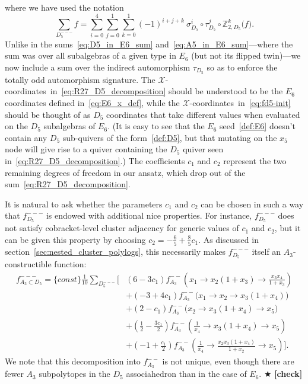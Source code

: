 \documentclass[12pt]{article}
\def\nl{\nonumber\\}
\def\xcoords{$\mathcal{X}$-coordinates}
\def\draftnote#1{{\color{red} $\bigstar$ }{\bf [#1]}}
\begin{document}
where we have used the notation
\begin{equation}
	\sum_{D_5^{---}} f = \sum_{i=0}^4\sum_{j=0}^1\sum_{k=0}^1 (-1)^{i+j+k}\  \sigma_{D_5}^i \circ \tau_{D_5}^j \circ \mathbb{Z}_{2,D_5}^k \big(f\big).
\end{equation}
Unlike in the sums~\eqref{eq:D5_in_E6_sum} and~\eqref{eq:A5_in_E6_sum}---where the sum was over all subalgebras of a given type in $E_6$ (but not its flipped twin)---we now include a sum over the indirect automorphism $\tau_{D_5}$ so as to enforce the totally odd automorphism signature. The \xcoords\ in~\eqref{eq:R27_D5_decomposition} should be understood to be the $E_6$ coordinates defined in~\eqref{eq:E6_x_def}, while the \xcoords\ in~\eqref{eq:fd5-init} should be thought of as $D_5$ coordinates that take different values when evaluated on the $D_5$ subalgebras of $E_6$. (It is easy to see that the $E_6$ seed~\eqref{def:E6} doesn't contain any $D_5$ sub-quivers of the form~\eqref{def:D5}, but that mutating on the $x_5$ node will give rise to a quiver containing the $D_5$ quiver seen in~\eqref{eq:R27_D5_decomposition}.) The coefficients $c_1$ and $c_2$ represent the two remaining degrees of freedom in our ansatz, which drop out of the sum~\eqref{eq:R27_D5_decomposition}.

It is natural to ask whether the parameters $c_1$ and $c_2$ can be chosen in such a way that $f_{D_5}^{---}$ is endowed with additional nice properties. For instance, $f_{D_5}^{---}$ does not satisfy cobracket-level cluster adjacency for generic values of $c_1$ and $c_2$, but it can be given this property by choosing $c_2 = -\frac{6}{5} + \frac{8}{5} c_1$. As discussed in section~\ref{sec:nested_cluster_polylogs}, this necessarily makes $f_{D_5}^{---}$ itself an $A_3$-constructible function:
\begin{align}
	f_{A_3\subset D_5}^{---} = \{ const \} \frac{1}{10}\sum_{D_5^{---}}\bigg[ 
	&\left(6-3 c_1\right) f_{A_3}^{--}\left(x_1\to x_2 \left(1+x_3\right)\to \frac{x_3 x_4}{1+x_3}\right)  \nonumber \\[-.34cm]
	&+ \left(-3+4 c_1\right) f_{A_3}^{--}\big(x_1\to x_2\to x_3 \left(1+x_4\right)\big)  \nl
	&+ \left(2-c_1\right) f_{A_3}^{--}\big(x_2\to x_3 \left(1+x_4\right)\to x_5\big) \nl
	&+ \left(\frac{1}{2}-\frac{3 c_1}{2}\right) f_{A_3}^{--}\left(\frac{1}{x_4}\to x_3 \left(1+x_4\right)\to x_5\right)  \nl
	&+ \left(-1+\frac{c_1}{2}\right) f_{A_3}^{--}\left(\frac{1}{x_4}\to \frac{x_2 x_3 \left(1+x_4\right)}{1+x_2}\to x_5\right) \bigg].
\end{align}
We note that this decomposition into $f_{A_3}^{--}$ is not unique, even though there are fewer $A_3$ subpolytopes in the $D_5$ associahedron than in the case of $E_6$. \draftnote{check} 
\end{document}
